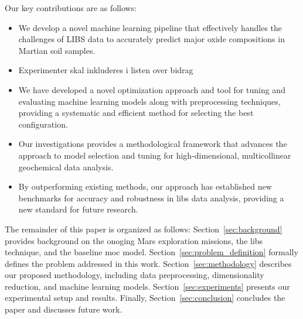 Our key contributions are as follows:
\begin{itemize}
    \item We develop a novel machine learning pipeline that effectively handles the challenges of LIBS data to accurately predict major oxide compositions in Martian soil samples.
    \item Experimenter skal inkluderes i listen over bidrag
    \item We have developed a novel optimization approach and tool for tuning and evaluating machine learning models along with preprocessing techniques, providing a systematic and efficient method for selecting the best configuration.
    \item Our investigations provides a methodological framework that advances the approach to model selection and tuning for high-dimensional, multicollinear geochemical data analysis.
    \item By outperforming existing methods, our approach has established new benchmarks for accuracy and robustness in \gls{libs} data analysis, providing a new standard for future research.
\end{itemize}


The remainder of this paper is organized as follows: 
Section~\ref{sec:background} provides background on the onoging Mars exploration missions, the \gls{libs} technique, and the baseline \gls{moc} model. 
Section~\ref{sec:problem_definition} formally defines the problem addressed in this work.
Section~\ref{sec:methodology} describes our proposed methodology, including data preprocessing, dimensionality reduction, and machine learning models. 
Section~\ref{sec:experiments} presents our experimental setup and results.
Finally, Section~\ref{sec:conclusion} concludes the paper and discusses future work.
